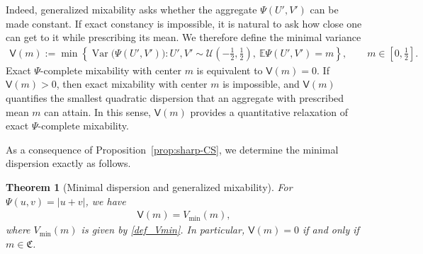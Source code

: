 \documentclass{article}
\newtheorem{theorem}{Theorem}[section]
\newcommand{\Var}{\operatorname{Var}}
\newcommand{\E}{\mathbb{E}}
\newcommand{\cU}{\mathcal{U}}
\begin{document}
Indeed, generalized mixability asks whether the aggregate \(\Psi(U',V')\) can be made constant.
If exact constancy is impossible, it is natural to ask how close one can get to it while prescribing its mean.
We therefore define the minimal variance
\begin{align}\label{eq:def-minimal-mixability-dispersion}
    \mathsf V(m)
    :=
    \min\left\{
        \Var\bigl(\Psi(U',V')\bigr):
        U',V'\sim\cU\left(-\frac12,\frac12\right),\
        \E\Psi(U',V')=m
    \right\}, \qquad m\in \left[0,\frac 1 2\right].
\end{align}
Exact \(\Psi\)-complete mixability with center \(m\) is equivalent to \(\mathsf V(m)=0\).
If \(\mathsf V(m)>0\), then exact mixability with center \(m\) is impossible, and \(\mathsf V(m)\) quantifies the smallest quadratic dispersion that an aggregate with prescribed mean \(m\) can attain.
In this sense, \(\mathsf V(m)\) provides a quantitative relaxation of exact \(\Psi\)-complete mixability.

As a consequence of Proposition~\ref{prop:sharp-CS}, we determine the minimal dispersion exactly as follows.

\begin{theorem}[Minimal dispersion and generalized mixability]
\label{cor:distance-mixability}
For \(\Psi(u,v)=|u+v|\), we have
\begin{align*}
    \mathsf V(m)=V_{\operatorname{min}}(m),
\end{align*}
where \(V_{\operatorname{min}}(m)\) is given by \eqref{def_Vmin}.
In particular, \(\mathsf V(m)=0\) if and only if \(m\in\mathfrak C\).
\end{theorem}
\end{document}
